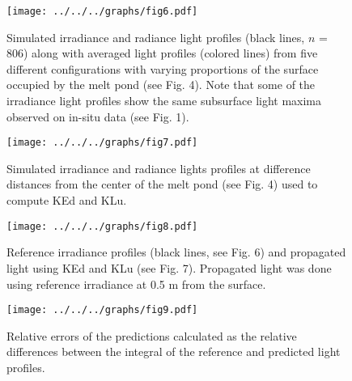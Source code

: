 \documentclass[12pt,a4paper]{scrartcl}
\begin{document}
\clearpage
\newpage

\begin{figure}[ht]
	\centering
	\texttt{[image: ../../../graphs/fig6.pdf]}
	\caption{Simulated irradiance and radiance light profiles (black lines, $n$ = 806) along with averaged light profiles (colored lines) from five different configurations with varying proportions of the surface occupied by the melt pond (see Fig. 4). Note that some of the irradiance light profiles show the same subsurface light maxima observed on in-situ data (see Fig. 1).}
\end{figure}

\clearpage
\newpage

\begin{figure}[ht]
	\centering
	\texttt{[image: ../../../graphs/fig7.pdf]}
	\caption{Simulated irradiance and radiance lights profiles at difference distances from the center of the melt pond (see Fig. 4) used to compute KEd and KLu.}
\end{figure}

\clearpage
\newpage

\begin{figure}[ht]
	\centering
	\texttt{[image: ../../../graphs/fig8.pdf]}
	\caption{Reference irradiance profiles (black lines, see Fig. 6) and propagated light using KEd and KLu (see Fig. 7). Propagated light was done using reference irradiance at 0.5 m from the surface.}
\end{figure}

\clearpage
\newpage

\begin{figure}[ht]
	\centering
	\texttt{[image: ../../../graphs/fig9.pdf]}
	\caption{Relative errors of the predictions calculated as the relative differences between the integral of the reference and predicted light profiles.}
\end{figure}
\end{document}
